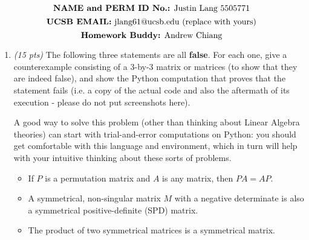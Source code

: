 \documentclass[11pt]{article}
\begin{document}
\noindent{}
$$\mbox{\textbf {NAME and PERM ID No.:} Justin Lang 5505771}$$
$$\mbox{\textbf {UCSB EMAIL:} jlang61@ucsb.edu (replace with yours)}$$
$$\mbox{\textbf {Homework Buddy:} Andrew Chiang}$$

\medskip
\noindent{}

\bigskip
\begin{enumerate}

\item
\textit{(15 pts)} The following three statements are all {\bf false}. For each one, 
give a counterexample consisting of a 3-by-3 matrix or matrices (to show that they are indeed false), 
and show the Python computation that proves that the statement fails (i.e. a copy of the actual code and also the aftermath of its execution - please do not put screenshots here). 

A good way to solve this problem (other than thinking about Linear Algebra theories) can start with trial-and-error computations on Python: you should get comfortable with this language and environment, which in turn will help with your intuitive thinking about these sorts of problems.

\begin{itemize}
\item
If $P$ is a permutation matrix and $A$ is any matrix, then $PA=AP$.

\item
A symmetrical, non-singular matrix $M$ with a negative determinate is also a symmetrical positive-definite (SPD) matrix.

\item
The product of two symmetrical matrices is a symmetrical matrix.
\end{itemize}


\end{enumerate}
\end{document}
